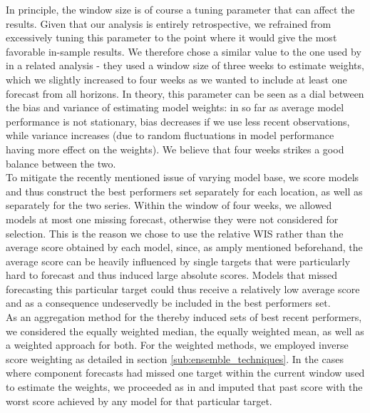 In principle, the window size is of course a tuning parameter that can affect the results. Given that our analysis is entirely retrospective, we refrained from excessively tuning this parameter to the point where it would give the most favorable in-sample results. We therefore chose a similar value to the one used by \cite{bracher_pre-registered_2021} in a related analysis - they used a window size of three weeks to estimate weights, which we slightly increased to four weeks as we wanted to include at least one forecast from all horizons. In theory, this parameter can be seen as a dial between the bias and variance of estimating model weights: in so far as average model performance is not stationary, bias decreases if we use less recent observations, while variance increases (due to random fluctuations in model performance having more effect on the weights). We believe that four weeks strikes a good balance between the two. \\%
To mitigate the recently mentioned issue of varying model base, we score models and thus construct the best performers set separately for each location, as well as separately for the two series. Within the window of four weeks, we allowed models at most one missing forecast, otherwise they were not considered for selection. This is the reason we chose to use the relative WIS rather than the average score obtained by each model, since, as amply mentioned beforehand, the average score can be heavily influenced by single targets that were particularly hard to forecast and thus induced large absolute scores. Models that missed forecasting this particular target could thus receive a relatively low average score and as a consequence undeservedly be included in the best performers set.\\
As an aggregation method for the thereby induced sets of best recent performers, we considered the equally weighted median, the equally weighted mean, as well as a weighted approach for both. For the weighted methods, we employed inverse score weighting as detailed in section \ref{sub:ensemble_techniques}. In the cases where component forecasts had missed one target within the current window used to estimate the weights, we proceeded as in \cite{bracher_pre-registered_2021} and imputed that past score with the worst score achieved by any model for that particular target.%
